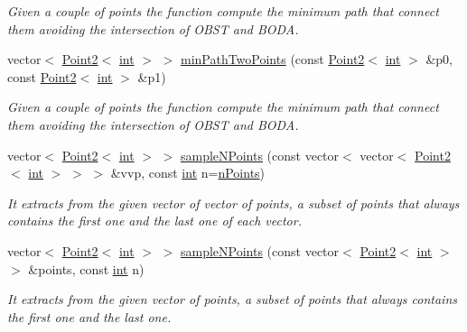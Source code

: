 \begin{DoxyCompactItemize}
\begin{DoxyCompactList}\small\item\em Given a couple of points the function compute the minimum path that connect them avoiding the intersection of O\+B\+ST and B\+O\+DA. \end{DoxyCompactList}\item 
vector$<$ \mbox{\hyperlink{class_point2}{Point2}}$<$ \mbox{\hyperlink{draw_8hh_aa620a13339ac3a1177c86edc549fda9b}{int}} $>$ $>$ \mbox{\hyperlink{class_mapp_a5b6a630049118dbfa22604f513db11f1}{min\+Path\+Two\+Points}} (const \mbox{\hyperlink{class_point2}{Point2}}$<$ \mbox{\hyperlink{draw_8hh_aa620a13339ac3a1177c86edc549fda9b}{int}} $>$ \&p0, const \mbox{\hyperlink{class_point2}{Point2}}$<$ \mbox{\hyperlink{draw_8hh_aa620a13339ac3a1177c86edc549fda9b}{int}} $>$ \&p1)
\begin{DoxyCompactList}\small\item\em Given a couple of points the function compute the minimum path that connect them avoiding the intersection of O\+B\+ST and B\+O\+DA. \end{DoxyCompactList}\item 
vector$<$ \mbox{\hyperlink{class_point2}{Point2}}$<$ \mbox{\hyperlink{draw_8hh_aa620a13339ac3a1177c86edc549fda9b}{int}} $>$ $>$ \mbox{\hyperlink{class_mapp_a34bd022816ce083d4bb125119f47f470}{sample\+N\+Points}} (const vector$<$ vector$<$ \mbox{\hyperlink{class_point2}{Point2}}$<$ \mbox{\hyperlink{draw_8hh_aa620a13339ac3a1177c86edc549fda9b}{int}} $>$ $>$ $>$ \&vvp, const \mbox{\hyperlink{draw_8hh_aa620a13339ac3a1177c86edc549fda9b}{int}} n=\mbox{\hyperlink{class_mapp_addd9fcc5e7db2c40038ab32ecf29171c}{n\+Points}})
\begin{DoxyCompactList}\small\item\em It extracts from the given vector of vector of points, a subset of points that always contains the first one and the last one of each vector. \end{DoxyCompactList}\item 
vector$<$ \mbox{\hyperlink{class_point2}{Point2}}$<$ \mbox{\hyperlink{draw_8hh_aa620a13339ac3a1177c86edc549fda9b}{int}} $>$ $>$ \mbox{\hyperlink{class_mapp_aaa8b4ed2cacdfdeb89d2b30b3684a535}{sample\+N\+Points}} (const vector$<$ \mbox{\hyperlink{class_point2}{Point2}}$<$ \mbox{\hyperlink{draw_8hh_aa620a13339ac3a1177c86edc549fda9b}{int}} $>$ $>$ \&points, const \mbox{\hyperlink{draw_8hh_aa620a13339ac3a1177c86edc549fda9b}{int}} n)
\begin{DoxyCompactList}\small\item\em It extracts from the given vector of points, a subset of points that always contains the first one and the last one. \end{DoxyCompactList}\item 

\end{DoxyCompactItemize}

